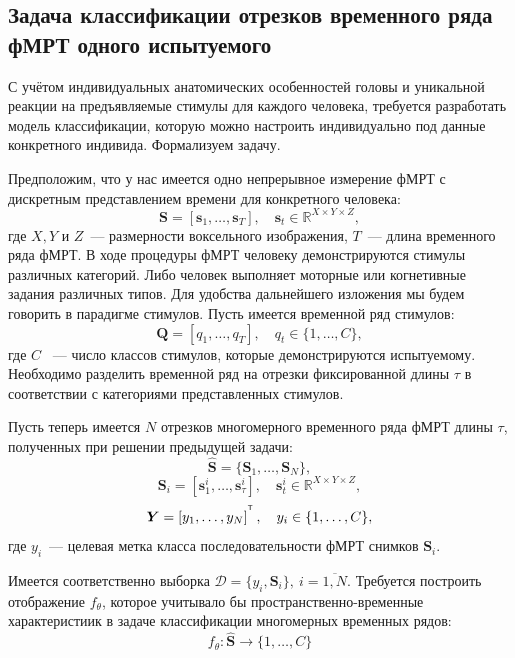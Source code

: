 \documentclass[a4paper, 12pt]{extarticle}
\begin{document}
\subsection{Задача классификации отрезков временного ряда фМРТ одного испытуемого}
С учётом индивидуальных анатомических особенностей головы и уникальной реакции на предъявляемые стимулы для каждого человека, 
требуется разработать модель классификации, которую можно настроить индивидуально под данные конкретного индивида. 
Формализуем задачу.

Предположим, что у нас имеется одно непрерывное измерение фМРТ с дискретным представлением времени для конкретного человека:
\begin{equation*}
	\bm{S} = [\bm{s}_{1}, \ldots, \bm{s}_{T}], \quad \bm{s}_{t} \in \mathbb{R}^{X \times Y \times Z},
\end{equation*}
где $X, Y$ и $Z$~--- размерности воксельного изображения, $T$~--- длина временного ряда фМРТ. 
В ходе процедуры фМРТ человеку демонстрируются стимулы различных категорий. 
Либо человек выполняет моторные или когнетивные задания различных типов. 
Для удобства дальнейшего изложения мы будем говорить в парадигме стимулов.
Пусть имеется временной ряд стимулов:
\begin{equation*}
	\bm{Q} = [{q}_{1}, \ldots, {q}_{T}], \quad {q}_{t} \in \{1,\dots, C\},
\end{equation*}
где $C$ ~--- число классов стимулов, которые демонстрируются испытуемому. 
Необходимо разделить временной ряд на отрезки фиксированной длины $\tau$ в соответствии с категориями представленных стимулов.

Пусть теперь имеется $N$ отрезков многомерного временного ряда фМРТ длины $\tau$, полученных при решении предыдущей задачи:
\begin{equation*} 
	\hat{\bm{S}} = \{\bm{S}_1,\dots, \bm{S}_{N}\},
\end{equation*}
\begin{equation*}
	\bm{S}_i = [\bm{s}_{1}^i, \ldots, \bm{s}_{\tau}^i], \quad
	\bm{s}_{t}^i \in \mathbb{R}^{X \times Y \times Z},
\end{equation*}
$$\bm{Y} = \left[y_1, \dots, y_{N}\right]^{^{\mathsf{T}}},\quad y_i \in \{1,\dots, C\},$$
где $y_i$~--- целевая метка класса последовательности фМРТ снимков $\bm{S}_i$.  

Имеется соответственно выборка $\mathcal{D} = \{y_i, \bm{S}_i\},~ i = \overline{1,N}$.
Требуется построить отображение $f_\theta$, которое учитывало 
бы пространственно-временные характеристиик в задаче классификации многомерных временных рядов:
$$f_\theta: \hat{\bm{S}} \rightarrow \{1,\dots, C\}$$  
\end{document}
